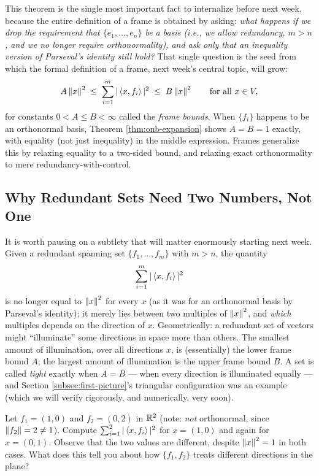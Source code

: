 \begin{remark*}
This theorem is the single most important fact to internalize before next week, because the entire definition of a frame is obtained by asking: \emph{what happens if we drop the requirement that $\{e_1, \dots, e_n\}$ be a basis (i.e., we allow redundancy, $m > n$, and we no longer require orthonormality), and ask only that an inequality version of Parseval's identity still hold?} That single question is the seed from which the formal definition of a frame, next week's central topic, will grow:
$$
A \left\| x \right\|^2 \;\leq\; \sum_{i=1}^m |\left\langle x, f_i \right\rangle|^2 \;\leq\; B \left\| x \right\|^2 \qquad \text{for all } x \in V,
$$
for constants $0 < A \leq B < \infty$ called the \emph{frame bounds}. When $\{f_i\}$ happens to be an orthonormal basis, Theorem \ref{thm:onb-expansion} shows $A = B = 1$ exactly, with equality (not just inequality) in the middle expression. Frames generalize this by relaxing equality to a two-sided bound, and relaxing exact orthonormality to mere redundancy-with-control.
\end{remark*}

\subsection{Why Redundant Sets Need Two Numbers, Not One}
\label{subsec:why-two-bounds}

It is worth pausing on a subtlety that will matter enormously starting next week. Given a redundant spanning set $\{f_1, \dots, f_m\}$ with $m > n$, the quantity
$$
\sum_{i=1}^m |\left\langle x, f_i \right\rangle|^2
$$
is no longer equal to $\left\| x \right\|^2$ for every $x$ (as it was for an orthonormal basis by Parseval's identity); it merely lies between two multiples of $\left\| x \right\|^2$, and \emph{which} multiples depends on the direction of $x$. Geometrically: a redundant set of vectors might ``illuminate'' some directions in space more than others. The smallest amount of illumination, over all directions $x$, is (essentially) the lower frame bound $A$; the largest amount of illumination is the upper frame bound $B$. A set is called \emph{tight} exactly when $A = B$ --- when every direction is illuminated equally --- and Section \ref{subsec:first-picture}'s triangular configuration was an example (which we will verify rigorously, and numerically, very soon).

\begin{exercisebox}[title={Exercise 1.1}]
Let $f_1 = (1,0)$ and $f_2 = (0, 2)$ in $\mathbb{R}^2$ (note: \emph{not} orthonormal, since $\left\| f_2 \right\| = 2 \ne 1$). Compute $\sum_{i=1}^2 |\left\langle x, f_i \right\rangle|^2$ for $x = (1,0)$ and again for $x = (0,1)$. Observe that the two values are different, despite $\left\| x \right\|^2 = 1$ in both cases. What does this tell you about how $\{f_1, f_2\}$ treats different directions in the plane?
\end{exercisebox}

